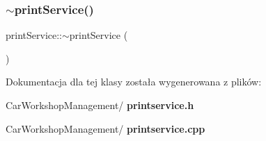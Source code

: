 \subsubsection{$\sim$printService()}
{\footnotesize\ttfamily print\+Service\+::$\sim$print\+Service (\begin{DoxyParamCaption}{ }\end{DoxyParamCaption})}



Dokumentacja dla tej klasy została wygenerowana z plików\+:\begin{DoxyCompactItemize}
\item 
Car\+Workshop\+Management/\textbf{ printservice.\+h}\item 
Car\+Workshop\+Management/\textbf{ printservice.\+cpp}\end{DoxyCompactItemize}
